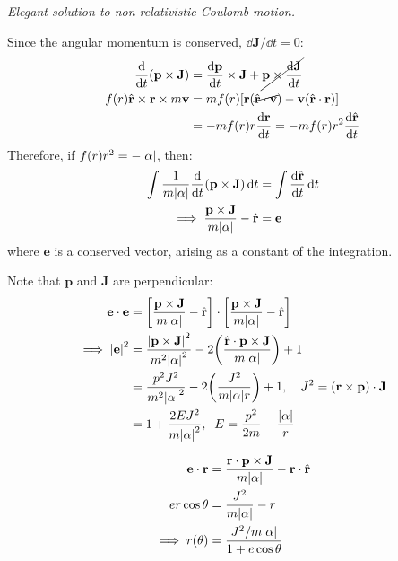 \documentclass{report}
\begin{document}
\begin{subquests}
	\item \emph{Elegant solution to non-relativistic Coulomb motion.}
	\begin{subquests}
		\item
		Since the angular momentum is conserved, $\dd{\mathbf J}/\dd{t} = 0$:
		\begin{align*}
			\dv{t}\pqty{\mathbf p \times \mathbf J} & = \dv{\mathbf p}{t}\times \mathbf J + \cancel{\mathbf p \times \dv{\mathbf J}{t}} \\
			f(r)\hat{\mathbf r} \times \mathbf r \times m\mathbf v & = mf(r)\bqty{\mathbf r\pqty{\cancel{\hat{\mathbf r}\cdot \mathbf v}} - \mathbf v\pqty{\hat{\mathbf r}\cdot \mathbf r}} \\
			& = -mf(r)r\dv{\mathbf r}{t} = -mf(r)r^2 \dv{\hat{\mathbf r}}{t}  
		\end{align*}
		Therefore, if $f(r)r^2 = -\abs{\alpha}$, then:
		\begin{align*}
			\int \frac{1}{m\abs{\alpha}}\dv{t}\pqty{\mathbf p \times \mathbf J} \dd{t} & = \int \dv{\hat{\mathbf r}}{t} \dd{t} \\
			\implies \frac{\mathbf p \times \mathbf J}{m\abs{\alpha}} - \hat{\mathbf r} & = \mathbf e
		\end{align*}
		where $\mathbf e$ is a conserved vector, arising as a constant of the integration. \\
		
		\item Note that $\mathbf p$ and $\mathbf J$ are perpendicular:
		\begin{align*}
			\mathbf e \cdot \mathbf e & = \bqty{\frac{\mathbf p \times \mathbf J}{m\abs{\alpha}} - \hat{\mathbf r}}\cdot \bqty{\frac{\mathbf p \times \mathbf J}{m\abs{\alpha}} - \hat{\mathbf r}} \\
			\implies \abs{\mathbf e}^2 & = \frac{\abs{\mathbf p \times \mathbf J}^2}{m^2\abs{\alpha}^2} - 2\pqty{\frac{\hat{\mathbf r} \cdot \mathbf p \times \mathbf J}{m\abs{\alpha}}} + 1 \\
			& = \frac{p^2 J^2}{m^2\abs{\alpha}^2}- 2\pqty{\frac{J^2}{m\abs{\alpha}r}} + 1, \quad J^2 = \pqty{\mathbf r \times \mathbf p} \cdot \mathbf J\\
			& = 1 + \frac{2EJ^2}{m\abs{\alpha}^2}, \;\; E = \frac{p^2}{2m} - \frac{\abs{\alpha}}{r}
		\end{align*}
		
		\item
		\begin{align*}
			\mathbf e \cdot \mathbf r & = \frac{\mathbf r \cdot \mathbf p \times \mathbf J}{m\abs{\alpha}} - \mathbf r \cdot \hat{\mathbf r} \\
			er\cos\theta & = \frac{J^2}{m\abs{\alpha}} - r \\
			\implies r(\theta) & = \frac{J^2/m\abs{\alpha}}{1+ e\cos\theta}
		\end{align*}


\end{subquests}
\end{subquests}
\end{document}
